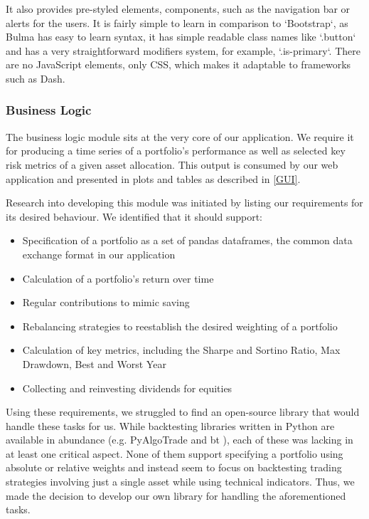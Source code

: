 It also provides pre-styled elements, components, such as the navigation bar or alerts for the users. It is fairly simple to learn in comparison to `Bootstrap`, as Bulma has easy to learn syntax, it has simple readable class names like `.button` and has a very straightforward modifiers system, for example,  `.is-primary`. There are no JavaScript elements, only CSS, which makes it adaptable to frameworks such as Dash.


\subsubsection{Business Logic}
\label{BL}

The business logic module sits at the very core of our application. We require it for producing a time series of a portfolio's performance as well as selected key risk metrics of a given asset allocation. This output is consumed by our web application and presented in plots and tables as described in \ref{GUI}.

Research into developing this module was initiated by listing our requirements for its desired behaviour. We identified that it should support:

\begin{itemize}
    \item Specification of a portfolio as a set of pandas dataframes, the common data exchange format in our application
    \item Calculation of a portfolio's return over time
    \item Regular contributions to mimic saving
    \item Rebalancing strategies to reestablish the desired weighting of a portfolio
    \item Calculation of key metrics, including the Sharpe and Sortino Ratio, Max Drawdown, Best and Worst Year
    \item Collecting and reinvesting dividends for equities
\end{itemize}

Using these requirements, we struggled to find an open-source library that would handle these tasks for us. While backtesting libraries written in Python are available in abundance (e.g. PyAlgoTrade \cite{PyAlgoTrade} and bt \cite{bt}), each of these was lacking in at least one critical aspect. None of them support specifying a portfolio using absolute or relative weights and instead seem to focus on backtesting trading strategies involving just a single asset while using technical indicators. Thus, we made the decision to develop our own library for handling the aforementioned tasks.

